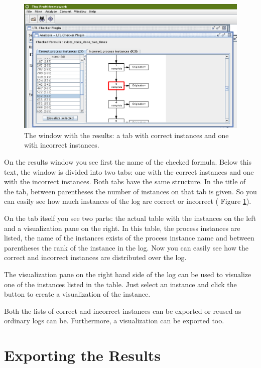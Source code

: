 \begin{figure}[H]
    \includegraphics[scale=0.4]{images/ltlchecker-check-results-cutted.eps}
    \caption{The window with the results: a tab with correct instances and one
    with incorrect instances.}
    \label{plugingui:results}
\end{figure}

On the results window you see first the name of the checked formula. Below
this text, the window is divided
into two tabs: one with the correct instances and one with the incorrect
instances. Both tabs have the same structure. In the title of the tab, between
parentheses the number of instances on that tab is given. So you can easily
see how much instances of the log are correct or incorrect ( Figure
\ref{plugingui:results}).

On the tab itself you see two parts: the actual table with the instances on
the left and a visualization pane on the right. In this table, the process
instances are listed, the name of the instances
exists of the process instance name and between parentheses the rank of the
instance in the log. Now you can easily see how the correct and incorrect instances are
distributed over the log.

The visualization pane on the right hand side of the log can be used to
visualize one of the instances listed in the table. Just select an instance and
click the  button
to create a visualization of the instance. 

Both the lists of correct and
incorrect instances can be exported or reused as ordinary logs can be.
Furthermore, a visualization can be exported too.

\section{Exporting the Results}
\label{plugingui:exproting}

